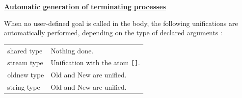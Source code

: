 \noindent\underline{\bf Automatic generation of terminating processes}
\vspace{1ex}\par
When no user-defined goal is called in the body, the following unifications
are automatically performed, depending on the type of declared arguments :

\vspace{1ex}
\hspace*{15mm}\begin{tabular}{l@{ :: }l}
shared type & Nothing done.\\
stream type & Unification with the atom \verb|[]|.\\
oldnew type & Old and New are unified.\\
string type & Old and New are unified.\\
\end{tabular}
\vspace{1ex}

